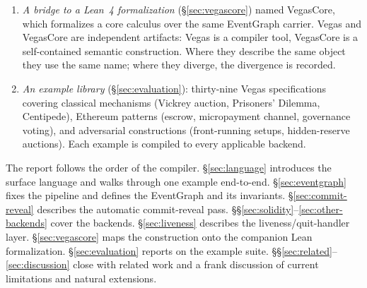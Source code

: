 \begin{enumerate}
\item \emph{A bridge to a Lean~4 formalization}
  (\S\ref{sec:vegascore}) named VegasCore, which formalizes a core
  calculus over the same EventGraph carrier.  Vegas and VegasCore
  are independent artifacts: Vegas is a compiler tool, VegasCore is
  a self-contained semantic construction.  Where they describe the
  same object they use the same name; where they diverge, the
  divergence is recorded.

\item \emph{An example library} (\S\ref{sec:evaluation}):
  thirty-nine Vegas specifications covering classical mechanisms
  (Vickrey auction, Prisoners' Dilemma, Centipede), Ethereum
  patterns (escrow, micropayment channel, governance voting), and
  adversarial constructions (front-running setups, hidden-reserve
  auctions).  Each example is compiled to every applicable
  backend.
\end{enumerate}

The report follows the order of the compiler.
\S\ref{sec:language} introduces the surface language and walks
through one example end-to-end.  \S\ref{sec:eventgraph} fixes the
pipeline and defines the EventGraph and its invariants.  \S\ref{sec:commit-reveal} describes the
automatic commit-reveal pass.  \S\S\ref{sec:solidity}--\ref{sec:other-backends}
cover the backends.  \S\ref{sec:liveness} describes the
liveness/quit-handler layer.  \S\ref{sec:vegascore} maps the
construction onto the companion Lean formalization.
\S\ref{sec:evaluation} reports on the example suite.
\S\S\ref{sec:related}--\ref{sec:discussion} close with related work
and a frank discussion of current limitations and natural
extensions.
